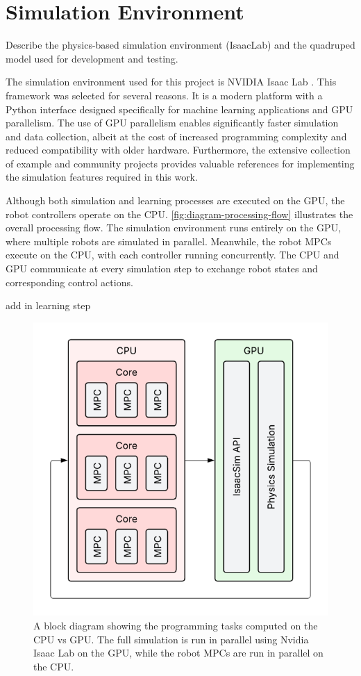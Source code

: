 \section{Simulation Environment}
\label{sec:simulation}

\begin{outline}
  Describe the physics-based simulation environment (IsaacLab) and
  the quadruped model used for development and testing.
\end{outline}

The simulation environment used for this project is NVIDIA Isaac Lab
\cite{mittal_orbit_2023}. This framework was selected for several
reasons. It is a modern platform with a Python interface designed
specifically for machine learning applications and GPU parallelism.
The use of GPU parallelism enables significantly faster simulation
and data collection, albeit at the cost of increased programming
complexity and reduced compatibility with older hardware.
Furthermore, the extensive collection of example and community
projects provides valuable references for implementing the simulation
features required in this work.

Although both simulation and learning processes are executed on the
GPU, the robot controllers operate on the CPU.
\autoref{fig:diagram-processing-flow} illustrates the overall
processing flow. The simulation environment runs entirely on the GPU,
where multiple robots are simulated in parallel. Meanwhile, the robot
MPCs execute on the CPU, with each controller running concurrently.
The CPU and GPU communicate at every simulation step to exchange
robot states and corresponding control actions.

\begin{todo}
  add in learning step
\end{todo}

\begin{figure}[H]
  \centering
  \includegraphics[width=0.5\linewidth]{images/diagrams/processing-flow.png}
  \caption{A block diagram showing the programming tasks computed on
    the CPU vs GPU. The full simulation is run in parallel using Nvidia
  Isaac Lab on the GPU, while the robot MPCs are run in parallel on the CPU.}
  \label{fig:diagram-processing-flow}
\end{figure}

